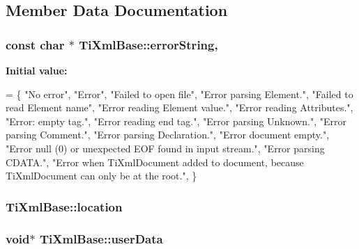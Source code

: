 \subsection{Member Data Documentation}
\hypertarget{class_ti_xml_base_a7ac8feec4100e446b3d78e1ac0659700}{
\subsubsection[{error\-String}]{\setlength{\rightskip}{0pt plus 5cm}const char $\ast$ Ti\-Xml\-Base\-::error\-String\hspace{0.3cm}{\ttfamily [static]}, {\ttfamily [protected]}}}\label{class_ti_xml_base_a7ac8feec4100e446b3d78e1ac0659700}
{\bfseries Initial value\-:}
\begin{DoxyCode}
=
\{
    \textcolor{stringliteral}{"No error"},
    \textcolor{stringliteral}{"Error"},
    \textcolor{stringliteral}{"Failed to open file"},
    \textcolor{stringliteral}{"Error parsing Element."},
    \textcolor{stringliteral}{"Failed to read Element name"},
    \textcolor{stringliteral}{"Error reading Element value."},
    \textcolor{stringliteral}{"Error reading Attributes."},
    \textcolor{stringliteral}{"Error: empty tag."},
    \textcolor{stringliteral}{"Error reading end tag."},
    \textcolor{stringliteral}{"Error parsing Unknown."},
    \textcolor{stringliteral}{"Error parsing Comment."},
    \textcolor{stringliteral}{"Error parsing Declaration."},
    \textcolor{stringliteral}{"Error document empty."},
    \textcolor{stringliteral}{"Error null (0) or unexpected EOF found in input stream."},
    \textcolor{stringliteral}{"Error parsing CDATA."},
    \textcolor{stringliteral}{"Error when TiXmlDocument added to document, because TiXmlDocument can only
       be at the root."},
\}
\end{DoxyCode}
\hypertarget{class_ti_xml_base_a0d992580f3bc264909f898e942677a3c}{
\subsubsection[{location}]{ Ti\-Xml\-Base\-::location\hspace{0.3cm}{\ttfamily [protected]}}}\label{class_ti_xml_base_a0d992580f3bc264909f898e942677a3c}
\hypertarget{class_ti_xml_base_ab242c01590191f644569fa89a080d97c}{
\subsubsection[{user\-Data}]{\setlength{\rightskip}{0pt plus 5cm}void$\ast$ Ti\-Xml\-Base\-::user\-Data\hspace{0.3cm}{\ttfamily [protected]}}}\label{class_ti_xml_base_ab242c01590191f644569fa89a080d97c}


